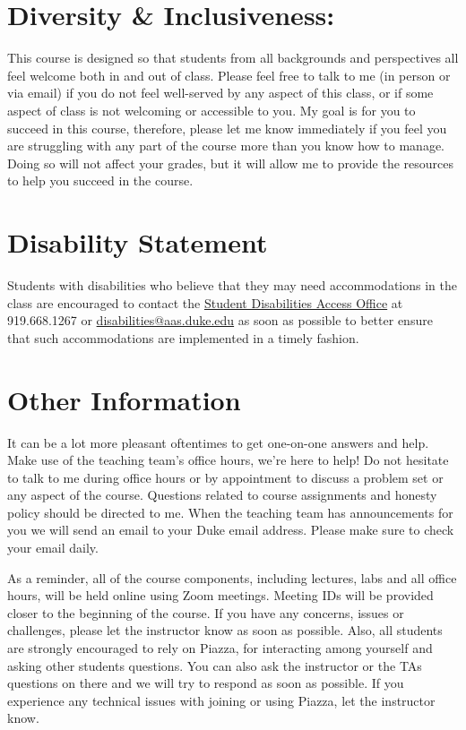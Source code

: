 \documentclass[11pt, a4paper]{article}
\begin{document}
\section{Diversity \& Inclusiveness:}
This course is designed so that students from all backgrounds and perspectives all feel welcome both in and out of class. Please feel free to talk to me (in person or via email) if you do not feel well-served by any aspect of this class, or if some aspect of class is not welcoming or accessible to you. My goal is for you to succeed in this course, therefore, please let me know immediately if you feel you are struggling with any part of the course more than you know how to manage. Doing so will not affect your grades, but it will allow me to provide the resources to help you succeed in the course.


\section{Disability Statement} 
Students with disabilities who believe that they may need accommodations in the class are encouraged to contact the \href{https://access.duke.edu/students/staff.php}{Student Disabilities Access Office} at 919.668.1267 or \href{mailto:disabilities@aas.duke.edu}{disabilities@aas.duke.edu}  as soon as possible to better ensure that such accommodations are implemented in a timely fashion.


\section{Other Information} 
It can be a lot more pleasant oftentimes to get one-on-one answers and help. Make use of the teaching team's office hours, we're here to help! Do not hesitate to talk to me during office hours or by appointment to discuss a problem set or any aspect of the course.  Questions related to course assignments and honesty policy should be directed to me. When the teaching team has announcements for you we will send an email to your Duke email address. Please make sure to check your email daily.

As a reminder, all of the course components, including lectures, labs and all office hours, will be held online using Zoom meetings. Meeting IDs will be provided closer to the beginning of the course. If you have any concerns, issues or challenges, please let the instructor know as soon as possible. Also, all students are strongly encouraged to rely on Piazza, for interacting among yourself and asking other students questions. You can also ask the instructor or the TAs questions on there and we will try to respond as soon as possible.  If you experience any technical issues with joining or using Piazza, let the instructor know.
\end{document}
